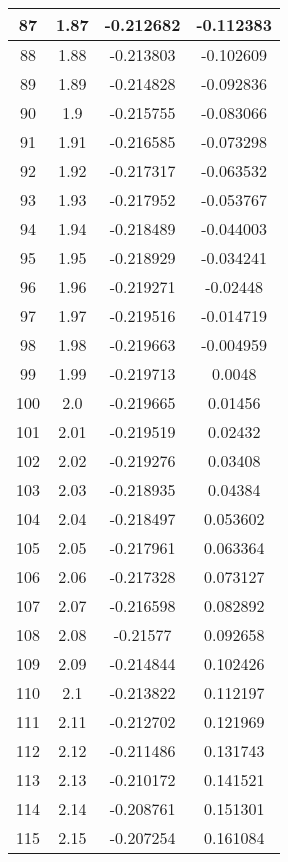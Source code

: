\begin{table}
\begin{center}
\begin{tabular}{c|c|c|c}
			\hline
			87 & 1.87 & -0.212682 & -0.112383 \\
			\hline
			88 & 1.88 & -0.213803 & -0.102609 \\
			\hline
			89 & 1.89 & -0.214828 & -0.092836 \\
			\hline
			90 & 1.9 & -0.215755 & -0.083066 \\
			\hline
			91 & 1.91 & -0.216585 & -0.073298 \\
			\hline
			92 & 1.92 & -0.217317 & -0.063532 \\
			\hline
			93 & 1.93 & -0.217952 & -0.053767 \\
			\hline
			94 & 1.94 & -0.218489 & -0.044003 \\
			\hline
			95 & 1.95 & -0.218929 & -0.034241 \\
			\hline
			96 & 1.96 & -0.219271 & -0.02448 \\
			\hline
			97 & 1.97 & -0.219516 & -0.014719 \\
			\hline
			98 & 1.98 & -0.219663 & -0.004959 \\
			\hline
			99 & 1.99 & -0.219713 & 0.0048 \\
			\hline
			100 & 2.0 & -0.219665 & 0.01456 \\
			\hline
			101 & 2.01 & -0.219519 & 0.02432 \\
			\hline
			102 & 2.02 & -0.219276 & 0.03408 \\
			\hline
			103 & 2.03 & -0.218935 & 0.04384 \\
			\hline
			104 & 2.04 & -0.218497 & 0.053602 \\
			\hline
			105 & 2.05 & -0.217961 & 0.063364 \\
			\hline
			106 & 2.06 & -0.217328 & 0.073127 \\
			\hline
			107 & 2.07 & -0.216598 & 0.082892 \\
			\hline
			108 & 2.08 & -0.21577 & 0.092658 \\
			\hline
			109 & 2.09 & -0.214844 & 0.102426 \\
			\hline
			110 & 2.1 & -0.213822 & 0.112197 \\
			\hline
			111 & 2.11 & -0.212702 & 0.121969 \\
			\hline
			112 & 2.12 & -0.211486 & 0.131743 \\
			\hline
			113 & 2.13 & -0.210172 & 0.141521 \\
			\hline
			114 & 2.14 & -0.208761 & 0.151301 \\
			\hline
			115 & 2.15 & -0.207254 & 0.161084 \\
			\hline

\end{tabular}
\end{center}
\end{table}
